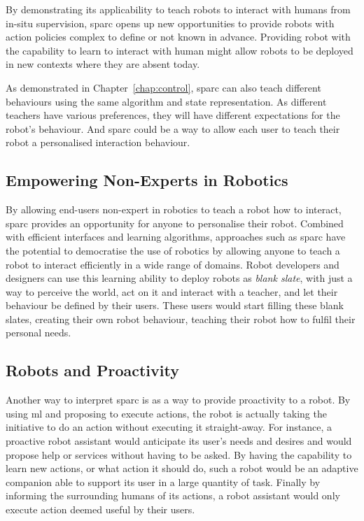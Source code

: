 By demonstrating its applicability to teach robots to interact with humans from in-situ supervision, \gls{sparc} opens up new opportunities to provide robots with action policies complex to define or not known in advance. Providing robot with the capability to learn to interact with human might allow robots to be deployed in new contexts where they are absent today.

As demonstrated in Chapter~\ref{chap:control}, \gls{sparc} can also teach different behaviours using the same algorithm and state representation. As different teachers have various preferences, they will have different expectations for the robot's behaviour. And \gls{sparc} could be a way to allow each user to teach their robot a personalised interaction behaviour.


\subsection{Empowering Non-Experts in Robotics}

By allowing end-users non-expert in robotics to teach a robot how to interact, \gls{sparc} provides an opportunity for anyone to personalise their robot. Combined with efficient interfaces and learning algorithms, approaches such as \gls{sparc} have the potential to democratise the use of robotics by allowing anyone to teach a robot to interact efficiently in a wide range of domains. Robot developers and designers can use this learning ability to deploy robots as \emph{blank slate}, with just a way to perceive the world, act on it and interact with a teacher, and let their behaviour be defined by their users. These users would start filling these blank slates, creating their own robot behaviour, teaching their robot how to fulfil their personal needs. 

\subsection{Robots and Proactivity}

Another way to interpret \gls{sparc} is as a way to provide proactivity to a robot. By using \gls{ml} and proposing to execute actions, the robot is actually taking the initiative to do an action without executing it straight-away. For instance, a proactive robot assistant would anticipate its user's needs and desires and would propose help or services without having to be asked. By having the capability to learn new actions, or what action it should do, such a robot would be an adaptive companion able to support its user in a large quantity of task. Finally by informing the surrounding humans of its actions, a robot assistant would only execute action deemed useful by their users.

